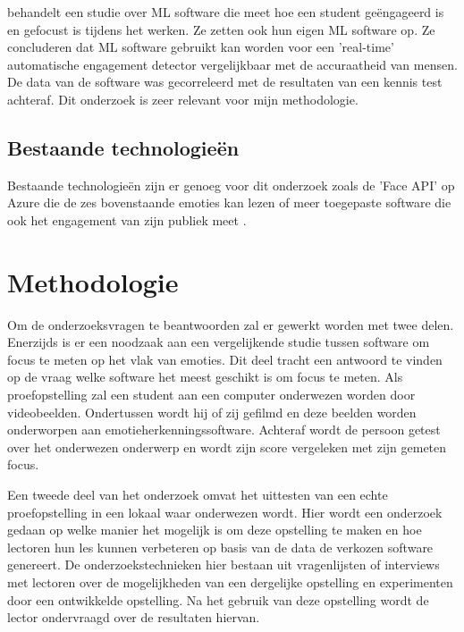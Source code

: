 \textcite{Whitehill2014} behandelt een studie over ML software die meet hoe een student geëngageerd is en gefocust is tijdens het werken. Ze zetten ook hun eigen ML software op. Ze concluderen dat ML software gebruikt kan worden voor een 'real-time' automatische engagement detector vergelijkbaar met de accuraatheid van mensen. De data van de software was gecorreleerd met de resultaten van een kennis test achteraf. Dit onderzoek is zeer relevant voor mijn methodologie.

\subsection{Bestaande technologieën}
Bestaande technologieën zijn er genoeg voor dit onderzoek zoals de 'Face API' op Azure die de zes bovenstaande emoties kan lezen of meer toegepaste software die ook het engagement van zijn publiek meet \autocite{Doerrfeld2015}.
\section{Methodologie}
\label{sec:methodologie}


Om de onderzoeksvragen te beantwoorden zal er gewerkt worden met twee delen. Enerzijds is er een noodzaak aan een vergelijkende studie tussen software om focus te meten op het vlak van emoties. Dit deel tracht een antwoord te vinden op de vraag welke software het meest geschikt is om focus te meten. Als proefopstelling zal een student aan een computer onderwezen worden door videobeelden. Ondertussen wordt hij of zij gefilmd en deze beelden worden onderworpen aan emotieherkenningssoftware. Achteraf wordt de persoon getest over het onderwezen onderwerp en wordt zijn score vergeleken met zijn gemeten focus.

Een tweede deel van het onderzoek omvat het uittesten van een echte proefopstelling in een lokaal waar onderwezen wordt. Hier wordt een onderzoek gedaan op welke manier het mogelijk is om deze opstelling te maken en hoe lectoren hun les kunnen verbeteren op basis van de data de verkozen software genereert. De onderzoekstechnieken hier bestaan uit vragenlijsten of interviews met lectoren over de mogelijkheden van een dergelijke opstelling en experimenten door een ontwikkelde opstelling. Na het gebruik van deze opstelling wordt de lector ondervraagd over de resultaten hiervan.



